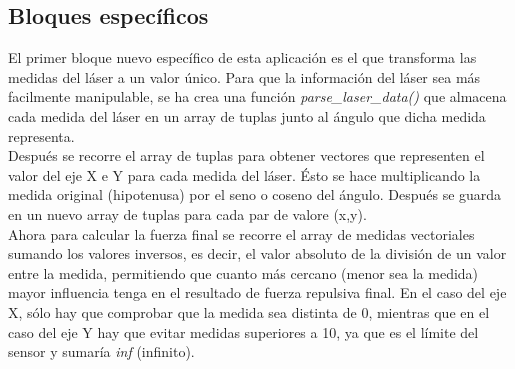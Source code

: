 \subsection{Bloques específicos}
\label{subsec:spec_bloques_VFF}

El primer bloque nuevo específico de esta aplicación es el que transforma las medidas del láser a un valor único.
Para que la información del láser sea más facilmente manipulable, se ha crea una función \textit{parse\_laser\_data()} que almacena cada medida del láser
en un array de tuplas junto al ángulo que dicha medida representa.\\

Después se recorre el array de tuplas para obtener vectores que representen el valor del eje X e Y para cada medida del láser. Ésto se hace multiplicando la medida
original (hipotenusa) por el seno o coseno del ángulo. Después se guarda en un nuevo array de tuplas para cada par de valore (x,y).\\

Ahora para calcular la fuerza final se recorre el array de medidas vectoriales sumando los valores inversos, es decir, el valor absoluto de la división de un valor
entre la medida, permitiendo que cuanto más cercano (menor sea la medida) mayor influencia tenga en el resultado de fuerza repulsiva final. En el caso del eje X, sólo
hay que comprobar que la medida sea distinta de 0, mientras que en el caso del eje Y hay que evitar medidas superiores a 10, ya que es el límite del sensor y
sumaría \textit{inf} (infinito).

